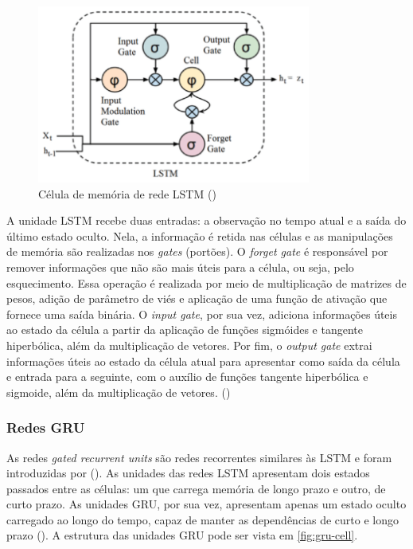 \begin{figure}[H]
  \includegraphics[width=9cm]{../figuras/redes/lstm-cell.png}
  \caption{Célula de memória de rede LSTM (\cite{deeplearningbook})}
  \label{fig:lstm-cell}
\end{figure}

A unidade LSTM recebe duas entradas: a observação no tempo atual e a saída do 
último estado oculto. Nela, a informação é retida nas células e as manipulações de memória 
são realizadas nos \textit{gates} (portões). O \textit{forget gate} é responsável
por remover informações que não são mais úteis para a célula, ou seja, pelo 
esquecimento. Essa operação é realizada por meio de multiplicação de matrizes 
de pesos, adição de parâmetro de viés e aplicação de uma função de ativação que fornece uma saída binária. 
O \textit{input gate}, por sua vez, adiciona informações úteis ao estado da célula
a partir da aplicação de funções sigmóides e tangente hiperbólica, além da multiplicação de vetores. 
Por fim, o \textit{output gate} extrai informações úteis ao estado da célula atual 
para apresentar como saída da célula e entrada para a seguinte, com o auxílio de funções tangente
hiperbólica e sigmoide, além da multiplicação de vetores. (\cite{deeplearningbook})

\subsubsection{Redes GRU}


As redes \textit{gated recurrent units} são redes recorrentes
similares às LSTM e foram introduzidas por (\cite{gru}).
As unidades
das redes LSTM apresentam dois estados passados entre as células:
um que carrega memória de longo prazo e outro, de curto prazo. As unidades 
GRU, por sua vez, apresentam apenas um 
estado oculto carregado ao longo do tempo, capaz de manter
as dependências de curto e longo prazo (\cite{deeplearningbook}). A 
estrutura das unidades GRU pode ser vista em \ref{fig:gru-cell}.

